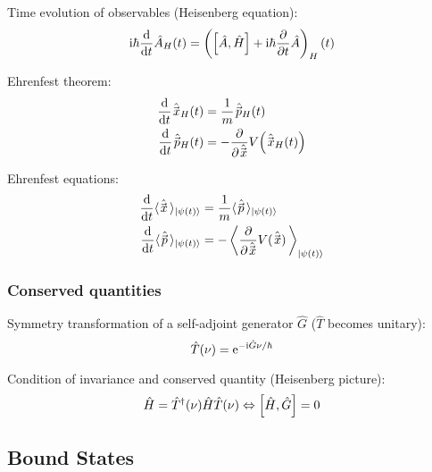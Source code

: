 			\noindent
			Time evolution of observables (Heisenberg equation):
			\begin{equation}
				\mathrm{i}\hbar \dv{t} \hat{A}_H(t) = \left(\left[\hat{A}, \hat{H}\right] + \mathrm{i}\hbar \pdv{t} \hat{A}\right)_H (t)
			\end{equation}

			\noindent
			Ehrenfest theorem:
			\begin{equation}
				\begin{aligned}
					\dv{t} \hat{\vec{x}}_H(t) &= \frac{1}{m}\hat{\vec{p}}_H(t) \\
					\dv{t} \hat{\vec{p}}_H(t) &= - \pdv{\hat{\vec{x}}} V \qty(\hat{\vec{x}}_H(t)) \\
				\end{aligned}
			\end{equation}

			\noindent
			Ehrenfest equations:
			\begin{equation}
				\begin{aligned}
					\dv{t} \langle \hat{\vec{x}} \,\rangle_{\Ket{\psi(t)}} &= \frac{1}{m} \langle \hat{\vec{p}} \,\rangle_{\Ket{\psi(t)}} \\
					\dv{t} \langle \hat{\vec{p}} \,\rangle_{\Ket{\psi(t)}} &= - \left\langle \pdv{\hat{\vec{x}}} V(\hat{\vec{x}}) \,\right\rangle_{\Ket{\psi(t)}} \\
				\end{aligned}
			\end{equation}

		\subsubsection{Conserved quantities}
			\noindent
			Symmetry transformation of a self-adjoint generator $\hat{G}$ ($\hat{T}$ becomes unitary):
			\begin{equation}
				\hat{T}(\nu) = \mathrm{e}^{-\mathrm{i}\hat{G}\nu/\hbar}
			\end{equation}

			\noindent
			Condition of invariance  and conserved quantity (Heisenberg picture):
			\begin{equation}
				\hat{H} =\hat{T}^\dagger(\nu)\hat{H} \hat{T}(\nu) \Leftrightarrow \comm{\hat{H}}{\hat{G}} = 0
			\end{equation}

	\subsection{Bound States}
